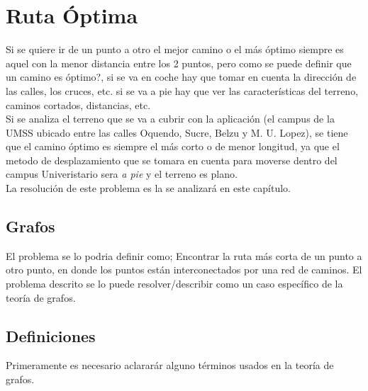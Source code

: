 \chapter{Ruta Óptima} %
\label{cha:ruta_optima}

Si se quiere ir de un punto a otro el mejor camino o el más óptimo siempre es aquel con la menor distancia entre los 2 puntos, pero como se puede definir que un camino es óptimo?, si se va en coche hay que tomar en cuenta la dirección de las calles, los cruces, etc. si se va a pie hay que ver las características del terreno, caminos cortados, distancias, etc.\\


Si se analiza el terreno que se va a cubrir con la aplicación (el campus de la UMSS ubicado entre las calles Oquendo, Sucre,  Belzu y M. U. Lopez), se tiene que el camino óptimo es siempre el más corto o de menor longitud, ya que el metodo de desplazamiento que se tomara en cuenta para moverse dentro del campus Univeristario sera \emph{a pie} y el terreno es plano.\\


La resolución de este problema es la se analizará en este capítulo.


  \section{Grafos} %
  \label{sec:teoria_grafos}

    El problema se lo podria definir como; Encontrar la ruta más corta de un punto a otro punto, en donde los puntos están interconectados por una red de caminos. El problema descrito se lo puede resolver/describir como un caso espec\'ifico de la teoría de grafos.


    \section{Definiciones} %
    \label{sec:grafos_definiciones}
      Primeramente es necesario aclarar\'ar alguno términos usados en la teoría de grafos.\\



